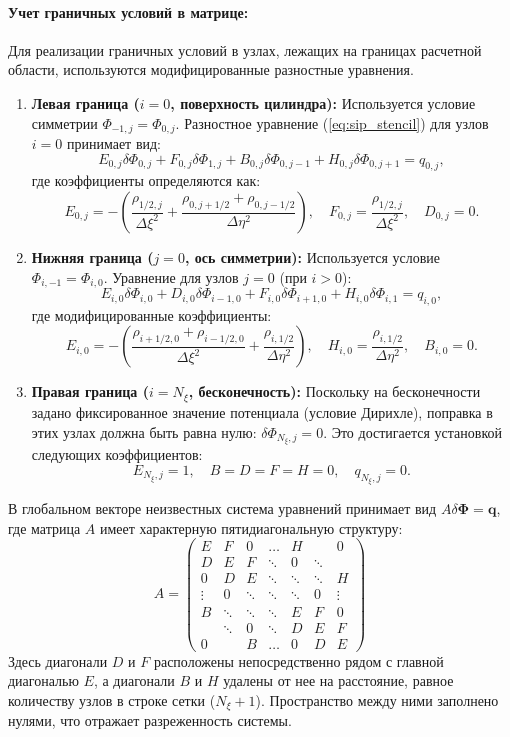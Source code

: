 \documentclass[a4paper,12pt]{article}
\begin{document}
	\paragraph{Учет граничных условий в матрице:}
	Для реализации граничных условий в узлах, лежащих на границах расчетной области, используются модифицированные разностные уравнения. 
	
	\begin{enumerate}
		\item \textbf{Левая граница ($i=0$, поверхность цилиндра):} 
		Используется условие симметрии $\Phi_{-1,j} = \Phi_{0,j}$. Разностное уравнение (\ref{eq:sip_stencil}) для узлов $i=0$ принимает вид:
		\[ E_{0,j} \delta\Phi_{0,j} + F_{0,j} \delta\Phi_{1,j} + B_{0,j} \delta\Phi_{0,j-1} + H_{0,j} \delta\Phi_{0,j+1} = q_{0,j}, \]
		где коэффициенты определяются как:
		\[ E_{0,j} = -\left( \frac{\rho_{1/2,j}}{\Delta \xi^2} + \frac{\rho_{0,j+1/2} + \rho_{0,j-1/2}}{\Delta \eta^2} \right), \quad F_{0,j} = \frac{\rho_{1/2,j}}{\Delta \xi^2}, \quad D_{0,j} = 0. \]
		
		\item \textbf{Нижняя граница ($j=0$, ось симметрии):} 
		Используется условие $\Phi_{i,-1} = \Phi_{i,0}$. Уравнение для узлов $j=0$ (при $i > 0$):
		\[ E_{i,0} \delta\Phi_{i,0} + D_{i,0} \delta\Phi_{i-1,0} + F_{i,0} \delta\Phi_{i+1,0} + H_{i,0} \delta\Phi_{i,1} = q_{i,0}, \]
		где модифицированные коэффициенты:
		\[ E_{i,0} = -\left( \frac{\rho_{i+1/2,0} + \rho_{i-1/2,0}}{\Delta \xi^2} + \frac{\rho_{i,1/2}}{\Delta \eta^2} \right), \quad H_{i,0} = \frac{\rho_{i,1/2}}{\Delta \eta^2}, \quad B_{i,0} = 0. \]
		
		\item \textbf{Правая граница ($i=N_\xi$, бесконечность):} 
		Поскольку на бесконечности задано фиксированное значение потенциала (условие Дирихле), поправка в этих узлах должна быть равна нулю: $\delta \Phi_{N_\xi,j} = 0$. Это достигается установкой следующих коэффициентов:
		\[ E_{N_\xi,j} = 1, \quad B = D = F = H = 0, \quad q_{N_\xi,j} = 0. \]
	\end{enumerate}



	В глобальном векторе неизвестных система уравнений принимает вид $A \delta \boldsymbol{\Phi} = \mathbf{q}$, где матрица $A$ имеет характерную пятидиагональную структуру:
	\[
	A = \begin{pmatrix}
		E & F & 0 & \dots & H & & 0 \\
		D & E & F & \ddots & 0 & \ddots & \\
		0 & D & E & \ddots & \ddots & \ddots & H \\
		\vdots & 0 & \ddots & \ddots & \ddots & 0 & \vdots \\
		B & \ddots & \ddots & \ddots & E & F & 0 \\
		& \ddots & 0 & \ddots & D & E & F \\
		0 & & B & \dots & 0 & D & E 
	\end{pmatrix}
	\]
	Здесь диагонали $D$ и $F$ расположены непосредственно рядом с главной диагональю $E$, а диагонали $B$ и $H$ удалены от нее на расстояние, равное количеству узлов в строке сетки ($N_\xi+1$). Пространство между ними заполнено нулями, что отражает разреженность системы.
\end{document}
